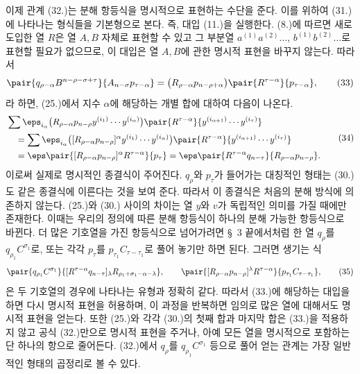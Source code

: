 
이제 관계 (32.)는 분해 항등식을 명시적으로 표현하는 수단을 준다. 이를 위하여 (31.)에 나타나는 형식들을 기본형으로 본다. 즉, 대입 (11.)을 실행한다. (8.)에 따르면 새로 도입한 열 $R$은 열 $A,B$ 자체로 표현할 수 있고 그 부분열 $a^{(1)}a^{(2)}\ldots$, $b^{(1)}b^{(2)}\ldots$로 표현할 필요가 없으므로, 이 대입은 열 $A,B$에 관한 명시적 표현을 바꾸지 않는다. 따라서
\begin{equation}
 \pair{q_{\rho-\alpha}B^{n-\rho-\sigma+\tau}}{A_{n-\sigma}p_{\tau-\alpha}}
 =\bigl(R_{\rho-\alpha}p_{n-\rho+\alpha}\bigr)
  \pair{R^{\tau-\alpha}}{p_{\tau-\alpha}},
\tag{33}
\end{equation}
라 하면, (25.)에서 지수 $\alpha$에 해당하는 개별 합에 대하여 다음이 나온다.
\begin{equation}
\begin{aligned}
&\sum \eps_{i_\alpha}\bigl(R_{\rho-\alpha}p_{n-\rho}y^{(i_1)}\cdots y^{(i_\alpha)}\bigr)
 \pair{R^{\tau-\alpha}}{y^{(i_{\alpha+1})}\cdots y^{(i_\tau)}}\\
&\quad=\sum \eps_{i_\alpha}\bigl([R_{\rho-\alpha}p_{n-\rho}]^\alpha y^{(i_1)}\cdots y^{(i_\alpha)}\bigr)
 \pair{R^{\tau-\alpha}}{y^{(i_{\alpha+1})}\cdots y^{(i_\tau)}}\\
&\quad=\eps\pair{[R_{\rho-\alpha}p_{n-\rho}]^\alpha R^{\tau-\alpha}}{p_\tau}
 =\eps\pair{R^{\tau-\alpha}q_{n-\tau}}{R_{\rho-\alpha}p_{n-\rho}}.
\end{aligned}
\tag{34}
\end{equation}
이로써 실제로 명시적인 종결식이 주어진다. $q_\rho$와 $p_\tau$가 들어가는 대칭적인 형태는 (30.)도 같은 종결식에 이른다는 것을 보여 준다. 따라서 이 종결식은 처음의 분해 방식에 의존하지 않는다. (25.)와 (30.) 사이의 차이는 열 $y$와 $v$가 독립적인 의미를 가질 때에만 존재한다. 이때는 우리의 정의에 따른 분해 항등식이 하나의 분해 가능한 항등식으로 바뀐다. 더 많은 기호열을 가진 항등식으로 넘어가려면 \S\ 3 끝에서처럼 한 열 $q_\rho$를 $q_{\rho_1}C^{\sigma_1}$로, 또는 각각 $p_\tau$를 $p_{\tau_1}C_{\tau-\tau_1}$로 풀어 놓기만 하면 된다. 그러면 생기는 식
\begin{equation}
 \pair{q_{\rho_1}C^{\sigma_1}}{[R^{\tau-\alpha}q_{n-\tau}]_\lambda R_{\rho_1+\sigma_1-\alpha-\lambda}},
 \qquad
 \pair{[R_{\rho-\alpha}p_{n-\rho}]^\lambda R^{\tau-\alpha}}{p_{\tau_1}C_{\tau-\tau_1}},
\tag{35}
\end{equation}
은 두 기호열의 경우에 나타나는 유형과 정확히 같다. 따라서 (33.)에 해당하는 대입을 하면 다시 명시적 표현을 허용하며, 이 과정을 반복하면 임의로 많은 열에 대해서도 명시적 표현을 얻는다. 또한 (25.)와 각각 (30.)의 첫째 합과 마지막 합은 (33.)을 적용하지 않고 공식 (32.)만으로 명시적 표현을 주거나, 아예 모든 열을 명시적으로 포함하는 단 하나의 항으로 줄어든다. (32.)에서 $q_\rho$를 $q_{\rho_1}C^{\sigma_1}$ 등으로 풀어 얻는 관계는 가장 일반적인 형태의 곱정리로 볼 수 있다.
